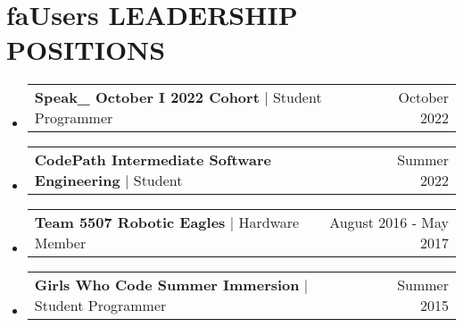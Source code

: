 \documentclass[a4paper,11pt]{article}
\makeatletter
\newcommand{\seticon}[1]{\textcolor{Cerulean}{\csname #1\endcsname}}
\newcommand{\resumeOrganizationsHeading}[2]{
  \vspace{-2pt}\item
    \begin{tabular*}{0.97\textwidth}[t]{l@{\extracolsep{\fill}}r}
      #1 & #2 \\
    \end{tabular*} \vspace{-20pt}
}
\newcommand{\resumeSubHeadingListStart}{\begin{itemize}[leftmargin=0.15in, label={}]}
\newcommand{\resumeSubHeadingListEnd}{\end{itemize}}
\makeatother
\begin{document}
\section{\seticon{faUsers} \textbf{LEADERSHIP POSITIONS}}
  \resumeSubHeadingListStart
  	  \resumeOrganizationsHeading
      {\textbf{Speak\_ October I 2022 Cohort} $|$ Student Programmer}{October 2022}
      \resumeOrganizationsHeading
      {\textbf{CodePath Intermediate Software Engineering} $|$ Student}{Summer 2022}
      \resumeOrganizationsHeading
      { \textbf{Team 5507 Robotic Eagles} $|$ Hardware Member}{August 2016 - May 2017}
      \resumeOrganizationsHeading
      {\textbf{Girls Who Code Summer Immersion} $|$ Student Programmer}{Summer 2015}
  \resumeSubHeadingListEnd 
\end{document}
